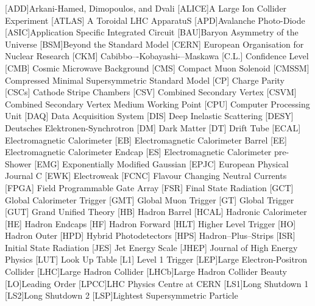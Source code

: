 \begin{acronym}[AAAAAAA]
[ADD]{Arkani-Hamed, Dimopoulos, and Dvali}
[ALICE]{A Large Ion Collider Experiment}
 [ATLAS] {A Toroidal LHC ApparatuS}
[APD]{Avalanche Photo-Diode}
[ASIC]{Application Specific Integrated Circuit}
[BAU]{Baryon Asymmetry of the Universe}
[BSM]{Beyond the Standard Model}
 [CERN] {European Organisation for Nuclear Research}
 [CKM] {Cabibbo–-Kobayashi-–Maskawa}
 [C.L.] {Confidence Level}
 [CMB] {Cosmic Microwave Background}
 [CMS] {Compact Muon Solenoid}
 [CMSSM] {Compressed Minimal Supersymmetric Standard Model}
 [CP] {Charge Parity}
 [CSCs] {Cathode Stripe Chambers}
 [CSV] {Combined Secondary Vertex}
 [CSVM] {Combined Secondary Vertex Medium Working Point}
 [CPU] {Computer Processing Unit}
 [DAQ] {Data Acquisition System}
 [DIS] {Deep Inelastic Scattering}
 [DESY] {Deutsches Elektronen-Synchrotron}
 [DM] {Dark Matter}
 [DT] {Drift Tube}
 [ECAL] {Electromagnetic Calorimeter}
 [EB] {Electromagnetic Calorimeter Barrel}
 [EE] {Electromagnetic Calorimeter Endcap}
 [ES] {Electromagnetic Calorimeter pre-Shower}
 [EMG] {Exponentially Modified Gaussian}
 [EPJC] {European Physical Journal C}
 [EWK] {Electroweak}
 [FCNC] {Flavour Changing Neutral Currents}
 [FPGA] {Field Programmable Gate Array}
 [FSR] {Final State Radiation}
 [GCT] {Global Calorimeter Trigger}
 [GMT] {Global Muon Trigger}
 [GT] {Global Trigger}
 [GUT] {Grand Unified Theory}
 [HB] {Hadron Barrel}
 [HCAL] {Hadronic Calorimeter}
 [HE] {Hadron Endcaps}
 [HF] {Hadron Forward}
[HLT] {Higher Level Trigger}
 [HO] {Hadron Outer}
 [HPD] {Hybrid Photodetectors}
 [HPS] {Hadron--Plus--Strips}
 [ISR] {Initial State Radiation}
 [JES] {Jet Energy Scale}
 [JHEP] {Journal of High Energy Physics}
 [LUT] {Look Up Table}
 [L1] {Level 1 Trigger}
[LEP]{Large Electron-Positron Collider}
[LHC]{Large Hadron Collider}
[LHCb]{Large Hadron Collider Beauty}
[LO]{Leading Order}
[LPCC]{LHC Physics Centre at CERN}
[LS1]{Long Shutdown 1}
[LS2]{Long Shutdown 2}
[LSP]{Lightest Supersymmetric Particle}

\end{acronym}
